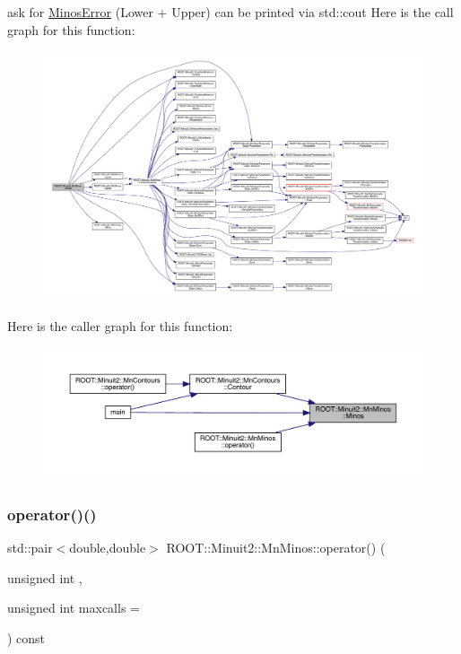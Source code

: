 ask for \mbox{\hyperlink{classROOT_1_1Minuit2_1_1MinosError}{Minos\+Error}} (Lower + Upper) can be printed via std\+::cout Here is the call graph for this function\+:\nopagebreak
\begin{figure}[H]
\begin{center}
\leavevmode
\includegraphics[width=350pt]{dc/d91/classROOT_1_1Minuit2_1_1MnMinos_aeb1fe39f5851b5af050191d812d21723_cgraph}
\end{center}
\end{figure}
Here is the caller graph for this function\+:\nopagebreak
\begin{figure}[H]
\begin{center}
\leavevmode
\includegraphics[width=350pt]{dc/d91/classROOT_1_1Minuit2_1_1MnMinos_aeb1fe39f5851b5af050191d812d21723_icgraph}
\end{center}
\end{figure}
\mbox{\label{classROOT_1_1Minuit2_1_1MnMinos_a82c85ed2e8212675339ffcc2a5bb61cb}} 
\subsubsection{\texorpdfstring{operator()()}{operator()()}\hspace{0.1cm}{\footnotesize\ttfamily [1/2]}}
{\footnotesize\ttfamily std\+::pair$<$double,double$>$ R\+O\+O\+T\+::\+Minuit2\+::\+Mn\+Minos\+::operator() (\begin{DoxyParamCaption}\item[{unsigned int}]{,  }\item[{unsigned int}]{maxcalls = {} }\end{DoxyParamCaption}) const}


